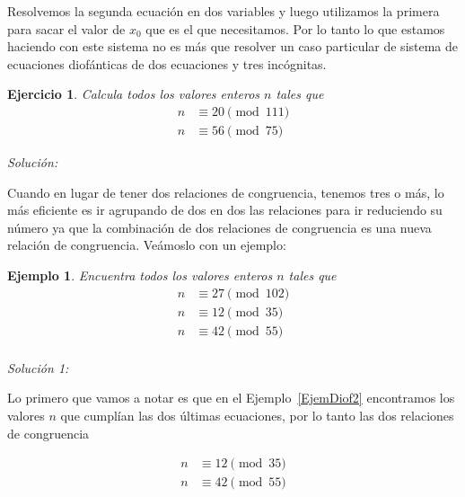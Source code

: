 \documentclass{amsart}
\newtheorem{ejer}{Ejercicio}
\newtheorem{ejem}{Ejemplo}
\begin{document}
Resolvemos la segunda ecuación en dos variables y luego utilizamos la 
primera para sacar el valor de $x_0$ que es el que necesitamos. Por lo
tanto lo que estamos haciendo con este sistema no es más que resolver 
un caso particular de sistema de ecuaciones diofánticas de dos ecuaciones
y tres incógnitas. 


\vspace{1cm}

\begin{ejer}
Calcula todos los valores enteros $n$ tales que 
\begin{align*}
n &\equiv 20 \pmod{111} \\
n &\equiv 56 \pmod{75} 
\end{align*}
\end{ejer}

{\it Solución: }



\vspace{1cm}

Cuando en lugar de tener dos relaciones de congruencia, tenemos tres o más, lo
más eficiente es ir agrupando de dos en dos las relaciones para ir reduciendo su
número ya que la combinación de dos relaciones de congruencia es una nueva 
relación de congruencia. Veámoslo con un ejemplo:

\begin{ejem}
Encuentra todos los valores enteros $n$ tales que 
\begin{align*}
n &\equiv 27 \pmod{102} \\
n &\equiv 12 \pmod{35} \\
n &\equiv 42 \pmod{55} \\
\end{align*}
\end{ejem}


{\it Solución 1: }

Lo primero que vamos a notar es que en el Ejemplo~\ref{EjemDiof2} encontramos 
los valores $n$ que cumplían las dos últimas ecuaciones, por lo tanto las dos 
relaciones de congruencia

\begin{align*}
n &\equiv 12 \pmod{35} \\
n &\equiv 42 \pmod{55} \\
\end{align*}
\end{document}
